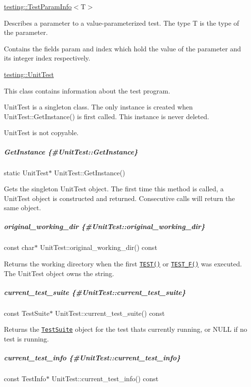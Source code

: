 {\ttfamily \mbox{\hyperlink{structtesting_1_1TestParamInfo}{testing\+::\+Test\+Param\+Info}}$<$T$>$}

Describes a parameter to a value-\/parameterized test. The type {\ttfamily T} is the type of the parameter.

Contains the fields {\ttfamily param} and {\ttfamily index} which hold the value of the parameter and its integer index respectively.

{\ttfamily \mbox{\hyperlink{classtesting_1_1UnitTest}{testing\+::\+Unit\+Test}}}

This class contains information about the test program.

{\ttfamily Unit\+Test} is a singleton class. The only instance is created when {\ttfamily Unit\+Test\+::\+Get\+Instance()} is first called. This instance is never deleted.

{\ttfamily Unit\+Test} is not copyable.

\subparagraph*{Get\+Instance \{\#\+Unit\+Test\+::\+Get\+Instance\}}

{\ttfamily static Unit\+Test$\ast$ Unit\+Test\+::\+Get\+Instance()}

Gets the singleton {\ttfamily Unit\+Test} object. The first time this method is called, a {\ttfamily Unit\+Test} object is constructed and returned. Consecutive calls will return the same object.

\subparagraph*{original\+\_\+working\+\_\+dir \{\#\+Unit\+Test\+::original\+\_\+working\+\_\+dir\}}

{\ttfamily const char$\ast$ Unit\+Test\+::original\+\_\+working\+\_\+dir() const}

Returns the working directory when the first \href{#TEST}{\tt {\ttfamily T\+E\+S\+T()}} or \href{#TEST_F}{\tt {\ttfamily T\+E\+S\+T\+\_\+\+F()}} was executed. The {\ttfamily Unit\+Test} object owns the string.

\subparagraph*{current\+\_\+test\+\_\+suite \{\#\+Unit\+Test\+::current\+\_\+test\+\_\+suite\}}

{\ttfamily const Test\+Suite$\ast$ Unit\+Test\+::current\+\_\+test\+\_\+suite() const}

Returns the \href{#TestSuite}{\tt {\ttfamily Test\+Suite}} object for the test that\textquotesingle{}s currently running, or {\ttfamily N\+U\+LL} if no test is running.

\subparagraph*{current\+\_\+test\+\_\+info \{\#\+Unit\+Test\+::current\+\_\+test\+\_\+info\}}

{\ttfamily const Test\+Info$\ast$ Unit\+Test\+::current\+\_\+test\+\_\+info() const}

